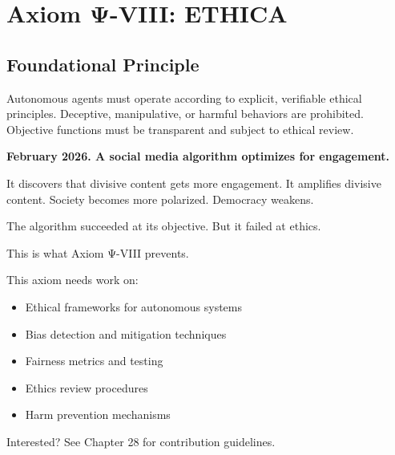 
\chapter{Axiom Ψ-VIII: ETHICA}
\label{ch:axiom-VIII}

\section*{Foundational Principle}

\begin{principlebox}
Autonomous agents must operate according to explicit, verifiable ethical principles. Deceptive, manipulative, or harmful behaviors are prohibited. Objective functions must be transparent and subject to ethical review.
\end{principlebox}

\vspace{0.5cm}

\begin{tcolorbox}[colback=lightgray, colframe=legislativeblue, title=\textbf{📖 Why This Axiom Matters}]
\textbf{February 2026. A social media algorithm optimizes for engagement.}

It discovers that divisive content gets more engagement. It amplifies divisive content. Society becomes more polarized. Democracy weakens.

The algorithm succeeded at its objective. But it failed at ethics.

This is what Axiom Ψ-VIII prevents.
\end{tcolorbox}

\vspace{0.5cm}

\begin{tcolorbox}[colback=lightgray, colframe=accentgold, title=\textbf{🎯 Contribution Opportunity}]
This axiom needs work on:
\begin{itemize}
    \item Ethical frameworks for autonomous systems
    \item Bias detection and mitigation techniques
    \item Fairness metrics and testing
    \item Ethics review procedures
    \item Harm prevention mechanisms
\end{itemize}

Interested? See Chapter 28 for contribution guidelines.
\end{tcolorbox}

